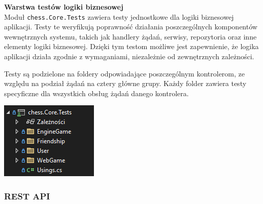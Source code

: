 \documentclass[twoside]{projektInzynierskiMS1}
\begin{document}
\noindent \textbf{Warstwa testów logiki biznesowej}\\
Moduł \texttt{chess.Core.Tests} zawiera testy jednostkowe dla logiki biznesowej aplikacji. Testy te weryfikują poprawność działania poszczególnych komponentów wewnętrznych systemu, takich jak handlery żądań, serwisy, repozytoria oraz inne elementy logiki biznesowej. Dzięki tym testom możliwe jest zapewnienie, że logika aplikacji działa zgodnie z wymaganiami, niezależnie od zewnętrznych zależności.

\vspace{0.5cm}
\noindent
\begin{minipage}[t]{0.5\textwidth}
    \vspace{0pt}
    \justifying 
    \noindent
    Testy są podzielone na foldery odpowiadające poszczególnym kontrolerom, ze względu na podział żądań na cztery główne grupy. Każdy folder zawiera testy specyficzne dla wszystkich obsług żądań danego kontrolera.
\end{minipage}
\hfill
\begin{minipage}[t]{0.4\textwidth}
    \vspace{0pt}
    \centering
    \includegraphics[width=\linewidth]{images/struktura_back_core_tests.png} 
\end{minipage}

\newpage

\subsubsection{REST API}
\end{document}
